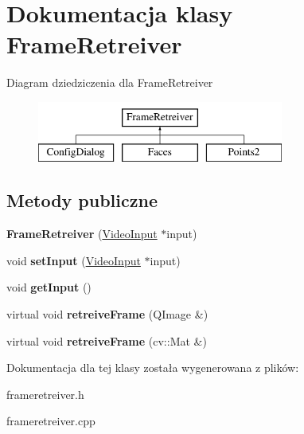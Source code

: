 \hypertarget{class_frame_retreiver}{
\section{Dokumentacja klasy FrameRetreiver}
\label{class_frame_retreiver}
}
Diagram dziedziczenia dla FrameRetreiver\begin{figure}[H]
\begin{center}
\leavevmode
\includegraphics[height=2cm]{class_frame_retreiver}
\end{center}
\end{figure}
\subsection*{Metody publiczne}
\begin{DoxyCompactItemize}
\item 
\hypertarget{class_frame_retreiver_aec5e4a7cd0af2badc9b47fd3c936ac60}{
{\bfseries FrameRetreiver} (\hyperlink{class_video_input}{VideoInput} $\ast$input)}
\label{class_frame_retreiver_aec5e4a7cd0af2badc9b47fd3c936ac60}

\item 
\hypertarget{class_frame_retreiver_a8d7772f0a3d6373f5a54bf4fcc042ccc}{
void {\bfseries setInput} (\hyperlink{class_video_input}{VideoInput} $\ast$input)}
\label{class_frame_retreiver_a8d7772f0a3d6373f5a54bf4fcc042ccc}

\item 
\hypertarget{class_frame_retreiver_a496222c421bf02b214d6a5c2a110698b}{
void {\bfseries getInput} ()}
\label{class_frame_retreiver_a496222c421bf02b214d6a5c2a110698b}

\item 
\hypertarget{class_frame_retreiver_a061c97e43f3b73705903e49afad3e5bf}{
virtual void {\bfseries retreiveFrame} (QImage \&)}
\label{class_frame_retreiver_a061c97e43f3b73705903e49afad3e5bf}

\item 
\hypertarget{class_frame_retreiver_a72912583af45c00d267f215a0d0b9bb1}{
virtual void {\bfseries retreiveFrame} (cv::Mat \&)}
\label{class_frame_retreiver_a72912583af45c00d267f215a0d0b9bb1}

\end{DoxyCompactItemize}


Dokumentacja dla tej klasy została wygenerowana z plików:\begin{DoxyCompactItemize}
\item 
frameretreiver.h\item 
frameretreiver.cpp\end{DoxyCompactItemize}
